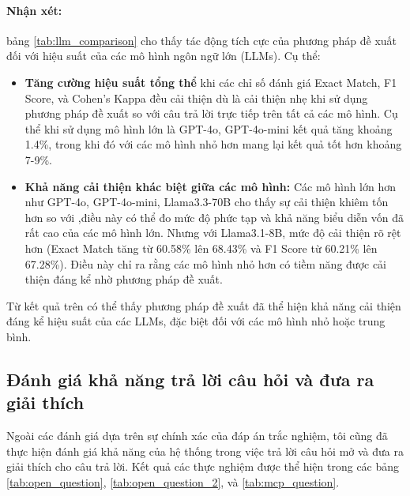 \paragraph{Nhận xét:}bảng \ref{tab:llm_comparison} cho thấy tác động tích cực của phương pháp đề xuất đối với hiệu suất của các mô hình ngôn ngữ lớn (LLMs). Cụ thể:
\begin{itemize}
    \item \textbf{Tăng cường hiệu suất tổng thể} khi các chỉ số đánh giá  Exact Match, F1 Score, và Cohen’s Kappa đều cải thiện dù là cải thiện nhẹ khi sử dụng phương pháp đề xuất so với câu trả lời trực tiếp trên tất cả các mô hình. Cụ thể khi sử dụng mô hình lớn là GPT-4o, GPT-4o-mini kết quả tăng khoảng 1.4\%, trong khi đó với các mô hình nhỏ hơn mang lại kết quả tốt hơn khoảng 7-9\%.
    \item \textbf{Khả năng cải thiện khác biệt giữa các mô hình:} Các mô hình lớn hơn như GPT-4o, GPT-4o-mini, Llama3.3-70B cho thấy sự cải thiện khiêm tốn hơn so với ,điều này có thể đo mức độ phức tạp và khả năng biểu diễn vốn đã rất cao của các mô hình lớn. Nhưng với Llama3.1-8B, mức độ cải thiện rõ rệt hơn (Exact Match tăng từ 60.58\% lên 68.43\% và F1 Score từ 60.21\% lên 67.28\%). Điều này chỉ ra rằng các mô hình nhỏ hơn có tiềm năng được cải thiện đáng kể nhờ phương pháp đề xuất.
\end{itemize}
Từ kết quả trên có thể thấy phương pháp đề xuất đã thể hiện khả năng cải thiện đáng kể hiệu suất của các LLMs, đặc biệt đối với các mô hình nhỏ hoặc trung bình.
\subsection{Đánh giá khả năng trả lời câu hỏi và đưa ra giải thích}
Ngoài các đánh giá dựa trên sự chính xác của đáp án trắc nghiệm, tôi cũng đã thực hiện đánh giá khả năng của hệ thống trong việc trả lời câu hỏi mở và đưa ra giải thích cho câu trả lời. Kết quả các thực nghiệm được thể hiện trong các bảng \ref{tab:open_question}, \ref{tab:open_question_2}, và \ref{tab:mcp_question}.


